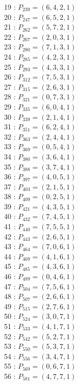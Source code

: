 \documentclass{article}
\begin{document}
{\begin{multicols}{2}
19 : $P_{239}=( 6, 4, 2, 1 )$\\
20 : $P_{247}=( 6, 5, 2, 1 )$\\
21 : $P_{262}=( 5, 7, 2, 1 )$\\
22 : $P_{267}=( 2, 0, 3, 1 )$\\
23 : $P_{280}=( 7, 1, 3, 1 )$\\
24 : $P_{285}=( 4, 2, 3, 1 )$\\
25 : $P_{293}=( 4, 3, 3, 1 )$\\
26 : $P_{312}=( 7, 5, 3, 1 )$\\
27 : $P_{315}=( 2, 6, 3, 1 )$\\
28 : $P_{321}=( 0, 7, 3, 1 )$\\
29 : $P_{335}=( 6, 0, 4, 1 )$\\
30 : $P_{339}=( 2, 1, 4, 1 )$\\
31 : $P_{351}=( 6, 2, 4, 1 )$\\
32 : $P_{363}=( 2, 4, 4, 1 )$\\
33 : $P_{369}=( 0, 5, 4, 1 )$\\
34 : $P_{380}=( 3, 6, 4, 1 )$\\
35 : $P_{388}=( 3, 7, 4, 1 )$\\
36 : $P_{397}=( 4, 0, 5, 1 )$\\
37 : $P_{403}=( 2, 1, 5, 1 )$\\
38 : $P_{409}=( 0, 2, 5, 1 )$\\
39 : $P_{421}=( 4, 3, 5, 1 )$\\
40 : $P_{432}=( 7, 4, 5, 1 )$\\
41 : $P_{440}=( 7, 5, 5, 1 )$\\
42 : $P_{443}=( 2, 6, 5, 1 )$\\
43 : $P_{464}=( 7, 0, 6, 1 )$\\
44 : $P_{469}=( 4, 1, 6, 1 )$\\
45 : $P_{485}=( 4, 3, 6, 1 )$\\
46 : $P_{489}=( 0, 4, 6, 1 )$\\
47 : $P_{504}=( 7, 5, 6, 1 )$\\
48 : $P_{507}=( 2, 6, 6, 1 )$\\
49 : $P_{515}=( 2, 7, 6, 1 )$\\
50 : $P_{524}=( 3, 0, 7, 1 )$\\
51 : $P_{533}=( 4, 1, 7, 1 )$\\
52 : $P_{542}=( 5, 2, 7, 1 )$\\
53 : $P_{550}=( 5, 3, 7, 1 )$\\
54 : $P_{556}=( 3, 4, 7, 1 )$\\
55 : $P_{569}=( 0, 6, 7, 1 )$\\
56 : $P_{581}=( 4, 7, 7, 1 )$\\
\end{multicols}
}
\end{document}
